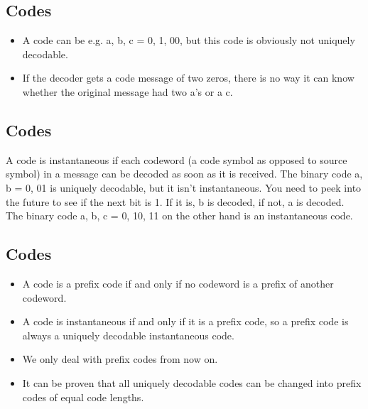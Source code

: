 \begin{frame}

\subsection*{Codes}
\begin{itemize}
\itam A code is any mapping from an input alphabet to an output alphabet. 
\item A code can be e.g. {a, b, c} = {0, 1, 00}, but this code is obviously not uniquely decodable. 
\item If the decoder gets a code message of two zeros, there is no way it can know whether the original message had two a's or a c.
\end{itemize}
\end{frame}
\begin{frame}

\subsection*{Codes}
A code is instantaneous if each codeword (a code symbol as opposed to source symbol) in a message can be decoded as soon as it is received. 
The binary code {a, b} = {0, 01} is uniquely decodable, but it isn't instantaneous. 
You need to peek into the future to see if the next bit is 1. 
If it is, b is decoded, if not, a is decoded. The binary code {a, b, c} = {0, 10, 11} on the other hand is an instantaneous code.
\end{frame}
\begin{frame}

\subsection*{Codes}
\begin{itemize}
\item A code is a prefix code if and only if no codeword is a prefix of another codeword. 
\item A code is instantaneous if and only if it is a prefix code, so a prefix code is always a uniquely decodable instantaneous code. 
\item We only deal with prefix codes from now on. 
\item It can be proven that all uniquely decodable codes can be changed into prefix codes of equal code lengths.
\end{itemize}
\end{frame}
